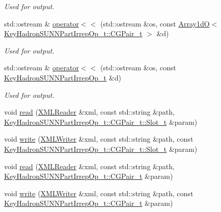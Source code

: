 \begin{DoxyCompactItemize}
\begin{DoxyCompactList}\small\item\em Used for output. \end{DoxyCompactList}\item 
std\+::ostream \& \mbox{\hyperlink{namespaceHadron_ae9b46ddd0929bce6b0f65be81daed91a}{operator$<$$<$}} (std\+::ostream \&os, const \mbox{\hyperlink{classADAT_1_1Array1dO}{Array1dO}}$<$ \mbox{\hyperlink{structHadron_1_1KeyHadronSUNNPartIrrepOp__t_1_1CGPair__t}{Key\+Hadron\+S\+U\+N\+N\+Part\+Irrep\+Op\+\_\+t\+::\+C\+G\+Pair\+\_\+t}} $>$ \&d)
\begin{DoxyCompactList}\small\item\em Used for output. \end{DoxyCompactList}\item 
std\+::ostream \& \mbox{\hyperlink{namespaceHadron_a4347887ac461374a85fd726b7dece87c}{operator$<$$<$}} (std\+::ostream \&os, const \mbox{\hyperlink{structHadron_1_1KeyHadronSUNNPartIrrepOp__t}{Key\+Hadron\+S\+U\+N\+N\+Part\+Irrep\+Op\+\_\+t}} \&d)
\begin{DoxyCompactList}\small\item\em Used for output. \end{DoxyCompactList}\item 
void \mbox{\hyperlink{namespaceHadron_a73f1c84ecf25af9f0187691f514b5570}{read}} (\mbox{\hyperlink{classADATXML_1_1XMLReader}{X\+M\+L\+Reader}} \&xml, const std\+::string \&path, \mbox{\hyperlink{structHadron_1_1KeyHadronSUNNPartIrrepOp__t_1_1CGPair__t_1_1Slot__t}{Key\+Hadron\+S\+U\+N\+N\+Part\+Irrep\+Op\+\_\+t\+::\+C\+G\+Pair\+\_\+t\+::\+Slot\+\_\+t}} \&param)
\item 
void \mbox{\hyperlink{namespaceHadron_aeeb688cdcca0a8494272d68cf2f15481}{write}} (\mbox{\hyperlink{classADATXML_1_1XMLWriter}{X\+M\+L\+Writer}} \&xml, const std\+::string \&path, const \mbox{\hyperlink{structHadron_1_1KeyHadronSUNNPartIrrepOp__t_1_1CGPair__t_1_1Slot__t}{Key\+Hadron\+S\+U\+N\+N\+Part\+Irrep\+Op\+\_\+t\+::\+C\+G\+Pair\+\_\+t\+::\+Slot\+\_\+t}} \&param)
\item 
void \mbox{\hyperlink{namespaceHadron_adc5eb75838fc176e1641d6264c9a894d}{read}} (\mbox{\hyperlink{classADATXML_1_1XMLReader}{X\+M\+L\+Reader}} \&xml, const std\+::string \&path, \mbox{\hyperlink{structHadron_1_1KeyHadronSUNNPartIrrepOp__t_1_1CGPair__t}{Key\+Hadron\+S\+U\+N\+N\+Part\+Irrep\+Op\+\_\+t\+::\+C\+G\+Pair\+\_\+t}} \&param)
\item 
void \mbox{\hyperlink{namespaceHadron_a835e4515b6f5e491ce57ac5169196d90}{write}} (\mbox{\hyperlink{classADATXML_1_1XMLWriter}{X\+M\+L\+Writer}} \&xml, const std\+::string \&path, const \mbox{\hyperlink{structHadron_1_1KeyHadronSUNNPartIrrepOp__t_1_1CGPair__t}{Key\+Hadron\+S\+U\+N\+N\+Part\+Irrep\+Op\+\_\+t\+::\+C\+G\+Pair\+\_\+t}} \&param)

\end{DoxyCompactItemize}
